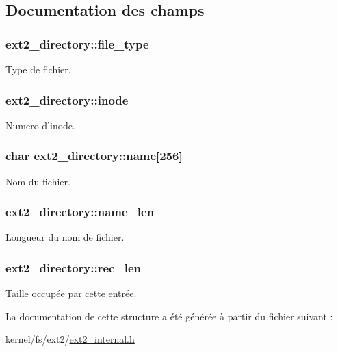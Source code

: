 \subsection{Documentation des champs}
\hypertarget{structext2__directory_a100a0ca76dac23225e9fbaa03b8925d0}{
\subsubsection[{file\-\_\-type}]{ ext2\-\_\-directory\-::file\-\_\-type}}\label{structext2__directory_a100a0ca76dac23225e9fbaa03b8925d0}
Type de fichier. \hypertarget{structext2__directory_a58f91a7939507e98be75baed206c149c}{
\subsubsection[{inode}]{ ext2\-\_\-directory\-::inode}}\label{structext2__directory_a58f91a7939507e98be75baed206c149c}
Numero d'inode. \hypertarget{structext2__directory_a68dde9644a76168693b569434ab17fd4}{
\subsubsection[{name}]{\setlength{\rightskip}{0pt plus 5cm}char ext2\-\_\-directory\-::name\mbox{[}256\mbox{]}}}\label{structext2__directory_a68dde9644a76168693b569434ab17fd4}
Nom du fichier. \hypertarget{structext2__directory_ab2ab4e90da260d09d51d74abdaabb095}{
\subsubsection[{name\-\_\-len}]{ ext2\-\_\-directory\-::name\-\_\-len}}\label{structext2__directory_ab2ab4e90da260d09d51d74abdaabb095}
Longueur du nom de fichier. \hypertarget{structext2__directory_a349e610d4d226a480c577c94b09a5eaf}{
\subsubsection[{rec\-\_\-len}]{ ext2\-\_\-directory\-::rec\-\_\-len}}\label{structext2__directory_a349e610d4d226a480c577c94b09a5eaf}
Taille occupée par cette entrée. 

La documentation de cette structure a été générée à partir du fichier suivant \-:\begin{DoxyCompactItemize}
\item 
kernel/fs/ext2/\hyperlink{ext2__internal_8h}{ext2\-\_\-internal.\-h}\end{DoxyCompactItemize}
